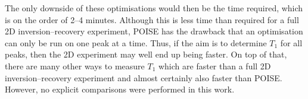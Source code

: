 The only downside of these optimisations would then be the time required, which is on the order of 2--4 minutes.
Although this is less time than required for a full 2D inversion--recovery experiment, POISE has the drawback that an optimisation can only be run on one peak at a time.
Thus, if the aim is to determine $T_1$ for all peaks, then the 2D experiment may well end up being faster.
On top of that, there are many other ways to measure $T_1$ which are faster than a full 2D inversion--recovery experiment and almost certainly also faster than POISE.\autocite{Christensen1974JPC,Homer1985JMR,Loening2003JMR,Smith2013CPC,Wei2021JOC}
However, no explicit comparisons were performed in this work.
